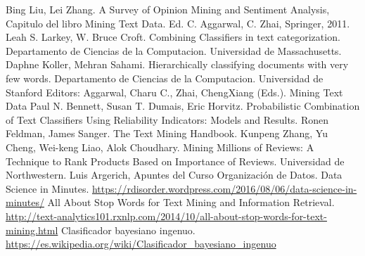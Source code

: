 \documentclass[a4paper,11pt]{report}
\begin{document}
\begin{thebibliography}{99}
 Bing Liu, Lei Zhang. A Survey of Opinion Mining and Sentiment Analysis, Capitulo del libro Mining Text Data. Ed. C. Aggarwal, C. Zhai, Springer, 2011.
 Leah S. Larkey, W. Bruce Croft. Combining Classifiers in text categorization. Departamento de Ciencias de la Computacion. Universidad de Massachusetts.
 Daphne Koller, Mehran Sahami. Hierarchically classifying documents with very few words. Departamento de Ciencias de la Computacion. Universidad de Stanford
 Editors: Aggarwal, Charu C., Zhai, ChengXiang (Eds.). Mining Text Data
 Paul N. Bennett, Susan T. Dumais, Eric Horvitz. Probabilistic Combination of Text Classifiers Using Reliability Indicators: Models and Results.
Ronen Feldman, James Sanger. The Text Mining Handbook.
 Kunpeng Zhang, Yu Cheng, Wei-keng Liao, Alok Choudhary. Mining Millions of Reviews: A Technique to Rank Products Based on Importance of Reviews. Universidad de Northwestern.
 Luis Argerich, Apuntes del Curso Organización de Datos.
 Data Science in Minutes. 
\url{ https://rdisorder.wordpress.com/2016/08/06/data-science-in-minutes/}
 All About Stop Words for Text Mining and Information Retrieval. 
\url{http://text-analytics101.rxnlp.com/2014/10/all-about-stop-words-for-text-mining.html}
 Clasificador bayesiano ingenuo. 
\url{https://es.wikipedia.org/wiki/Clasificador_bayesiano_ingenuo}
\end{thebibliography}
\end{document}
